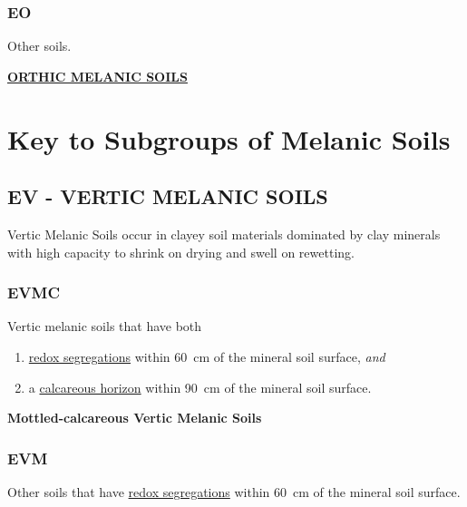 \documentclass[
  letterpaper,
  DIV=11,
  numbers=noendperiod]{scrreprt}
\providecommand{\tightlist}{%
  \setlength{\itemsep}{0pt}\setlength{\parskip}{0pt}}\usepackage{longtable,booktabs,array}
\begin{document}
\hypertarget{sec-key-EO}{%
\subsubsection{\texorpdfstring{\textbf{EO}}{EO}}\label{sec-key-EO}}

Other soils.

\protect\hyperlink{sec-EO}{\textbf{ORTHIC MELANIC SOILS}}

\hypertarget{sec-sub-E}{%
\section{Key to Subgroups of Melanic Soils}\label{sec-sub-E}}

\hypertarget{sec-EV}{%
\subsection{\texorpdfstring{\textbf{EV} - VERTIC MELANIC
SOILS}{EV - VERTIC MELANIC SOILS}}\label{sec-EV}}

Vertic Melanic Soils occur in clayey soil materials dominated by clay
minerals with high capacity to shrink on drying and swell on rewetting.

\hypertarget{sec-key-EVMC}{%
\subsubsection{\texorpdfstring{\textbf{EVMC}}{EVMC}}\label{sec-key-EVMC}}

Vertic melanic soils that have both

\begin{enumerate}
\def\labelenumi{\arabic{enumi}.}
\tightlist
\item
  \protect\hyperlink{sec-diag-rsegs}{redox segregations} within 60~cm of
  the mineral soil surface, \emph{and}
\item
  a \protect\hyperlink{sec-diag_calch}{calcareous horizon} within 90~cm
  of the mineral soil surface.
\end{enumerate}

\textbf{Mottled-calcareous Vertic Melanic Soils}

\hypertarget{sec-key-EVM}{%
\subsubsection{\texorpdfstring{\textbf{EVM}}{EVM}}\label{sec-key-EVM}}

Other soils that have \protect\hyperlink{sec-diag-rsegs}{redox
segregations} within 60~cm of the mineral soil surface.
\end{document}
